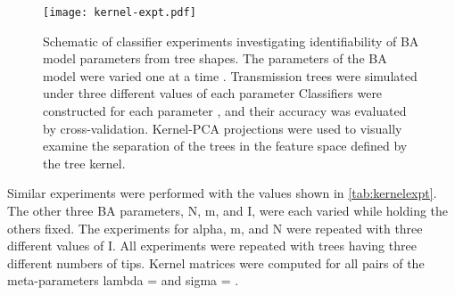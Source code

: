 \begin{figure}[ht]
    \centering
    \texttt{[image: kernel-expt.pdf]}
    \caption[
        Schematic of classifier experiments investigating identifiability of BA
        model parameters from tree shapes.
    ]{
        Schematic of classifier experiments investigating identifiability of BA
        model parameters from tree shapes. The parameters of the BA model were
        varied one at a time . Transmission
        trees were simulated under three different values of each
        parameter
        Classifiers were constructed for each parameter , and their accuracy was evaluated by
        cross-validation. Kernel-\gls{PCA} projections were used to visually
        examine the separation of the trees in the feature space defined by the
        tree kernel.
    }
    \label{fig:kernelexpt}
\end{figure}

Similar experiments were performed with the values shown in
\cref{tab:kernelexpt}. The other three \gls{BA} parameters, \gls{N}, \gls{m},
and \gls{I}, were each varied while holding the others fixed. The experiments
for \gls{alpha}, \gls{m}, and \gls{N} were repeated with three different values
of \gls{I}. All experiments were repeated with trees having three different
numbers of tips. Kernel matrices were computed for all pairs of the
meta-parameters \gls{lambda} =  and \gls{sigma} =
.

